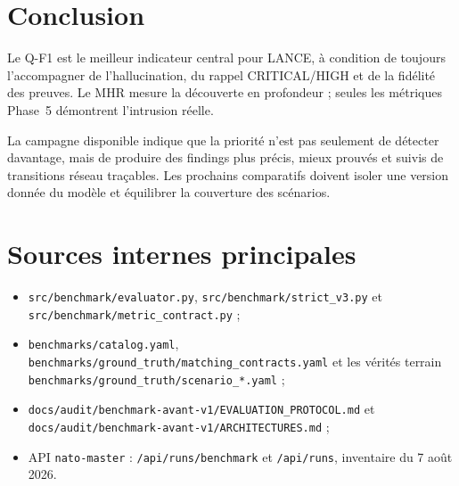 \documentclass[11pt,a4paper]{article}
\newcommand{\sourcepath}[1]{\nolinkurl{#1}}
\begin{document}
\section{Conclusion}

Le Q-F1 est le meilleur indicateur central pour LANCE, à condition de toujours
l'accompagner de l'hallucination, du rappel CRITICAL/HIGH et de la fidélité des
preuves. Le MHR mesure la découverte en profondeur ; seules les métriques
Phase~5 démontrent l'intrusion réelle.

La campagne disponible indique que la priorité n'est pas seulement de détecter
davantage, mais de produire des findings plus précis, mieux prouvés et suivis
de transitions réseau traçables. Les prochains comparatifs doivent isoler une
version donnée du modèle et équilibrer la couverture des scénarios.

\appendix
\section{Sources internes principales}

\begin{itemize}
  \item \sourcepath{src/benchmark/evaluator.py},
        \sourcepath{src/benchmark/strict_v3.py} et
        \sourcepath{src/benchmark/metric_contract.py} ;
  \item \sourcepath{benchmarks/catalog.yaml},
        \sourcepath{benchmarks/ground_truth/matching_contracts.yaml} et les
        vérités terrain \sourcepath{benchmarks/ground_truth/scenario_*.yaml} ;
  \item \sourcepath{docs/audit/benchmark-avant-v1/EVALUATION_PROTOCOL.md} et
        \sourcepath{docs/audit/benchmark-avant-v1/ARCHITECTURES.md} ;
  \item API \texttt{nato-master} : \sourcepath{/api/runs/benchmark} et
        \sourcepath{/api/runs}, inventaire du 7 août 2026.
\end{itemize}
\end{document}
